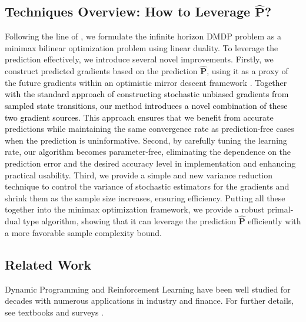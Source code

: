 \documentclass[12pt]{article}
\begin{document}
\subsection{Techniques Overview: How to Leverage $\hat{\boldsymbol{\text{P}}}$?}

Following the line of \cite{wang2017primal,wang2020randomized,jin2020efficiently}, we formulate the infinite horizon DMDP problem as a minimax bilinear optimization problem using linear duality. To leverage the prediction effectively, we introduce several novel improvements. 
Firstly, we construct predicted gradients based on the prediction $\hat{\boldsymbol{\text{P}}}$, using it as a proxy of the future gradients within an optimistic mirror descent framework \cite{rakhlin2013online,joulani2017modular,orabona2019modern}. 
\textcolor{black}{Together with the standard approach of constructing stochastic unbiased gradients from sampled state transitions, our method introduces a novel combination of these two gradient sources.} This approach ensures that we benefit from accurate predictions while maintaining the same convergence rate as prediction-free cases when the prediction is uninformative.
Second, by carefully tuning the learning rate, our algorithm becomes parameter-free, eliminating the dependence on the prediction error and the desired accuracy level in implementation and enhancing practical usability.
Third, we provide a simple and new variance reduction technique to control the variance of stochastic estimators for the gradients and shrink them as the sample size increases, ensuring efficiency. Putting all these together into the minimax optimization framework, we provide a robust primal-dual type algorithm, showing that it can leverage the prediction $\hat{\boldsymbol{\text{P}}}$ efficiently with a more favorable sample complexity bound.

\subsection{Related Work}


Dynamic Programming and Reinforcement Learning have been well studied for decades with numerous applications in industry and finance. For further details, see textbooks \cite{bellman1966dynamic,bertsekas1996neuro,bertsekas2012dynamic,bertsekas2022abstract,sutton2018reinforcement,szepesvari2022algorithms} and surveys \cite{kaelbling1996reinforcement,arulkumaran2017deep}.
\end{document}
